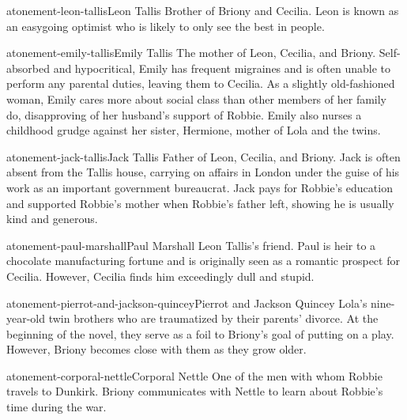 \documentclass[preview]{standalone}
\begin{document}
\begin{snippetcharacter}{atonement-leon-tallis}{Leon Tallis}
    Brother of Briony and Cecilia. Leon is known as an easygoing optimist who is likely to only see the best in people.
\end{snippetcharacter}

\begin{snippetcharacter}{atonement-emily-tallis}{Emily Tallis}
    The mother of Leon, Cecilia, and Briony. Self-absorbed and hypocritical, Emily has frequent migraines and is often unable to perform any parental duties, leaving them to Cecilia. As a slightly old-fashioned woman, Emily cares more about social class than other members of her family do, disapproving of her husband's support of Robbie. Emily also nurses a childhood grudge against her sister, Hermione, mother of Lola and the twins.
\end{snippetcharacter}

\begin{snippetcharacter}{atonement-jack-tallis}{Jack Tallis}
    Father of Leon, Cecilia, and Briony. Jack is often absent from the Tallis house, carrying on affairs in London under the guise of his work as an important government bureaucrat. Jack pays for Robbie's education and supported Robbie's mother when Robbie's father left, showing he is usually kind and generous.
\end{snippetcharacter}

\begin{snippetcharacter}{atonement-paul-marshall}{Paul Marshall}
    Leon Tallis's friend. Paul is heir to a chocolate manufacturing fortune and is originally seen as a romantic prospect for Cecilia. However, Cecilia finds him exceedingly dull and stupid.
\end{snippetcharacter}

\begin{snippetcharacter}{atonement-pierrot-and-jackson-quincey}{Pierrot and Jackson Quincey}
    Lola's nine-year-old twin brothers who are traumatized by their parents' divorce. At the beginning of the novel, they serve as a foil to Briony's goal of putting on a play. However, Briony becomes close with them as they grow older.
\end{snippetcharacter}

\begin{snippetcharacter}{atonement-corporal-nettle}{Corporal Nettle}
    One of the men with whom Robbie travels to Dunkirk. Briony communicates with Nettle to learn about Robbie's time during the war.
\end{snippetcharacter}
\end{document}
